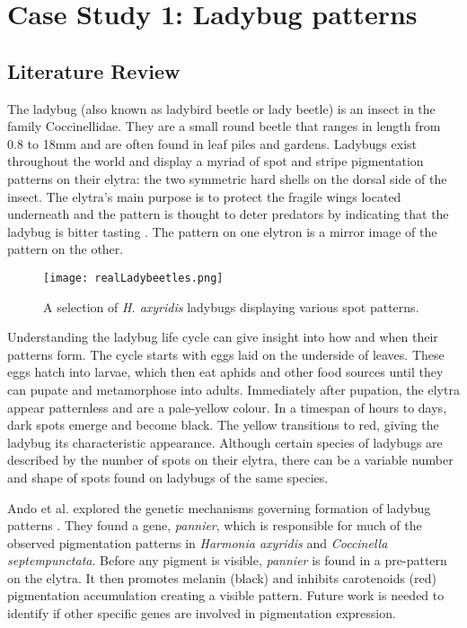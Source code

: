 \chapter{Case Study 1: Ladybug patterns}

\section{Literature Review}
The ladybug (also known as ladybird beetle or lady beetle) is an insect in the family Coccinellidae. They are a small round beetle that ranges in length from 0.8 to 18mm \cite{King1996} and are often found in leaf piles and gardens. Ladybugs exist throughout the world and display a myriad of spot and stripe pigmentation patterns on their elytra: the two symmetric hard shells on the dorsal side of the insect. The elytra's main purpose is to protect the fragile wings located underneath and the pattern is thought to deter predators by indicating that the ladybug is bitter tasting \cite{King1996}. The pattern on one elytron is a mirror image of the pattern on the other. 

\begin{figure}[ht]
	\centering
	\texttt{[image: realLadybeetles.png]}
	\caption{A selection of \textit{H. axyridis} ladybugs displaying various spot patterns. \cite{Entomart2019}}
	\label{fig:realLadyBugPatterns}
\end{figure}

Understanding the ladybug life cycle can give insight into how and when their patterns form. The cycle starts with eggs laid on the underside of leaves. These eggs hatch into larvae, which then eat aphids and other food sources until they can pupate and metamorphose into adults. Immediately after pupation, the elytra appear patternless and are a pale-yellow colour. In a timespan of hours to days, dark spots emerge and become black. The yellow transitions to red, giving the ladybug its characteristic appearance. Although certain species of ladybugs are described by the number of spots on their elytra, there can be a variable number and shape of spots found on ladybugs of the same species.

Ando et al. explored the genetic mechanisms governing formation of ladybug patterns \cite{Ando2018}. They found a gene, \textit{pannier}, which is responsible for much of the observed pigmentation patterns in \textit{Harmonia axyridis} and \textit{Coccinella septempunctata}. Before any pigment is visible, \textit{pannier} is found in a pre-pattern on the elytra. It then promotes melanin (black) and inhibits carotenoids (red) pigmentation accumulation creating a visible pattern. Future work is needed to identify if other specific genes are involved in pigmentation expression.

